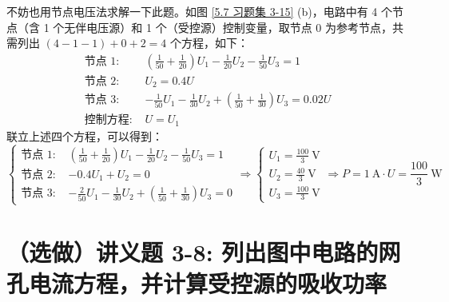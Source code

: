 \documentclass[UTF8]{report}
\theoremstyle{MyLineTheoremStyle} %
\theoremstyle{MyBlockTheoremStyle} %
\theoremstyle{MySubsubsectionStyle} %
\begin{document}
不妨也用节点电压法求解一下此题。如图 \ref{5.7 习题集 3-15} (b)，电路中有 4 个节点（含 1 个无伴电压源）和 1 个（受控源）控制变量，取节点 0 为参考节点，共需列出 $ (4 - 1 - 1) + 0 + 2 = 4$ 个方程，如下：
\begin{align}
\text{节点 1: } & \left(\frac{1}{50} + \frac{1}{20}\right) U_1 - \frac{1}{20}U_2 - \frac{1}{50}U_3 = 1 \\ 
\text{节点 2: } & U_2 = 0.4 U \\
\text{节点 3: } & - \frac{1}{50}U_1 - \frac{1}{30}U_2 + \left(\frac{1}{50} + \frac{1}{30}\right)U_3 = 0.02 U \\ 
\text{控制方程: } & U = U_1
\end{align}
联立上述四个方程，可以得到：
\begin{equation}
\begin{cases}
    \text{节点 1: } & \left(\frac{1}{50} + \frac{1}{20}\right) U_1 - \frac{1}{20}U_2 - \frac{1}{50}U_3 = 1 \\ 
    \text{节点 2: } & -0.4 U_1 + U_2 = 0 \\
    \text{节点 3: } & - \frac{2}{50}U_1 - \frac{1}{30}U_2 + \left(\frac{1}{50} + \frac{1}{30}\right)U_3 = 0
\end{cases}
\Longrightarrow 
\begin{cases}
    U_1 = \frac{100}{3} \ \mathrm{V}\\ 
    U_2 = \frac{40}{3} \ \mathrm{V}\\ 
    U_3 = \frac{100}{3} \ \mathrm{V}
\end{cases}
\Longrightarrow P = 1 \ \mathrm{A}\cdot U = \frac{100}{3} \ \mathrm{W}
\end{equation}

\section{（选做）讲义题 3-8: 列出图中电路的网孔电流方程，并计算受控源的吸收功率}
\end{document}
